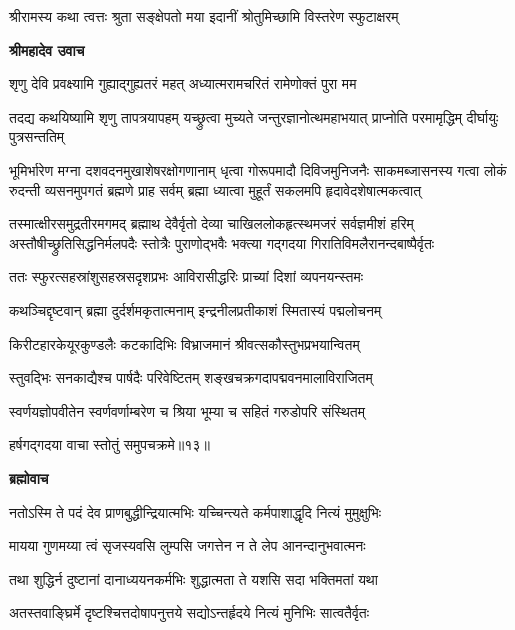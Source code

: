 \twolineshloka
{श्रीरामस्य कथा त्वत्तः श्रुता सङ्क्षेपतो मया}
{इदानीं श्रोतुमिच्छामि विस्तरेण स्फुटाक्षरम्} %

\textbf{श्रीमहादेव उवाच}

\twolineshloka
{शृणु देवि प्रवक्ष्यामि गुह्याद्गुह्यतरं महत्}
{अध्यात्मरामचरितं रामेणोक्तं पुरा मम} %

\threelineshloka
{तदद्य कथयिष्यामि शृणु तापत्रयापहम्}
{यच्छ्रुत्वा मुच्यते जन्तुरज्ञानोत्थमहाभयात्}
{प्राप्नोति परमामृद्धिम् दीर्घायुः पुत्रसन्ततिम्} %

\fourlineindentedshloka
{भूमिर्भारेण मग्ना दशवदनमुखाशेषरक्षोगणानाम्}
{धृत्वा गोरूपमादौ दिविजमुनिजनैः साकमब्जासनस्य}
{गत्वा लोकं रुदन्ती व्यसनमुपगतं ब्रह्मणे प्राह सर्वम्}
{ब्रह्मा ध्यात्वा मुहूर्तं सकलमपि हृदावेदशेषात्मकत्वात्} %

\fourlineindentedshloka
{तस्मात्क्षीरसमुद्रतीरमगमद् ब्रह्माथ देवैर्वृतो}
{देव्या चाखिललोकहृत्स्थमजरं सर्वज्ञमीशं हरिम्}
{अस्तौषीच्छ्रुतिसिद्धनिर्मलपदैः स्तोत्रैः पुराणोद्भवैः}
{भक्त्या गद्गदया गिरातिविमलैरानन्दबाष्पैर्वृतः} %

\twolineshloka
{ततः स्फुरत्सहस्रांशुसहस्रसदृशप्रभः}
{आविरासीद्धरिः प्राच्यां दिशां व्यपनयन्स्तमः} %

\twolineshloka
{कथञ्चिद्दृष्टवान् ब्रह्मा दुर्दर्शमकृतात्मनाम्}
{इन्द्रनीलप्रतीकाशं स्मितास्यं पद्मलोचनम्} %

\twolineshloka
{किरीटहारकेयूरकुण्डलैः कटकादिभिः}
{विभ्राजमानं श्रीवत्सकौस्तुभप्रभयान्वितम्} %

\twolineshloka
{स्तुवद्भिः सनकाद्यैश्च पार्षदैः परिवेष्टितम्}
{शङ्खचक्रगदापद्मवनमालाविराजितम्} %

\twolineshloka
{स्वर्णयज्ञोपवीतेन स्वर्णवर्णाम्बरेण च}
{श्रिया भूम्या च सहितं गरुडोपरि संस्थितम्} %

{हर्षगद्गदया वाचा स्तोतुं समुपचक्रमे॥१३॥} %


\textbf{ब्रह्मोवाच}

\twolineshloka
{नतोऽस्मि ते पदं देव प्राणबुद्धीन्द्रियात्मभिः}
{यच्चिन्त्यते कर्मपाशाद्धृदि नित्यं मुमुक्षुभिः} %

\twolineshloka
{मायया गुणमय्या त्वं सृजस्यवसि लुम्पसि}
{जगत्तेन न ते लेप आनन्दानुभवात्मनः} %

\twolineshloka
{तथा शुद्धिर्न दुष्टानां दानाध्ययनकर्मभिः}
{शुद्धात्मता ते यशसि सदा भक्तिमतां यथा} %

\twolineshloka
{अतस्तवाङ्घ्रिर्मे दृष्टश्चित्तदोषापनुत्तये}
{सद्योऽन्तर्हृदये नित्यं मुनिभिः सात्वतैर्वृतः} %


